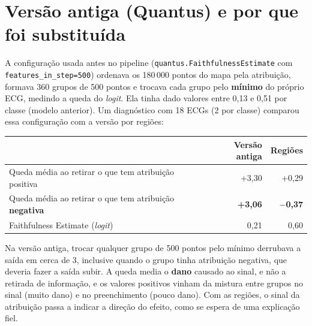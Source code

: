 \documentclass[11pt,a4paper]{article}
\begin{document}
\section{Versão antiga (Quantus) e por que foi substituída}
A configuração usada antes no pipeline (\texttt{quantus.FaithfulnessEstimate} com \texttt{features\_in\_step=500}) ordenava os 180\,000 pontos do mapa pela atribuição, formava 360 grupos de 500 pontos e trocava cada grupo pelo \textbf{mínimo} do próprio ECG, medindo a queda do \textit{logit}. Ela tinha dado valores entre 0,13 e 0,51 por classe (modelo anterior). Um diagnóstico com 18 ECGs (2 por classe) comparou essa configuração com a versão por regiões:
\begin{center}\small
\begin{tabularx}{\linewidth}{Xrr}
\toprule
& \textbf{Versão antiga} & \textbf{Regiões} \\
\midrule
Queda média ao retirar o que tem atribuição positiva & +3,30 & +0,29 \\
Queda média ao retirar o que tem atribuição \textbf{negativa} & \textbf{+3,06} & \textbf{$-$0,37} \\
Faithfulness Estimate (\textit{logit}) & 0,21 & 0,60 \\
\bottomrule
\end{tabularx}
\end{center}
Na versão antiga, trocar qualquer grupo de 500 pontos pelo mínimo derrubava a saída em cerca de 3, inclusive quando o grupo tinha atribuição negativa, que deveria fazer a saída subir. A queda media o \textbf{dano} causado ao sinal, e não a retirada de informação, e os valores positivos vinham da mistura entre grupos no sinal (muito dano) e no preenchimento (pouco dano). Com as regiões, o sinal da atribuição passa a indicar a direção do efeito, como se espera de uma explicação fiel.
\end{document}
